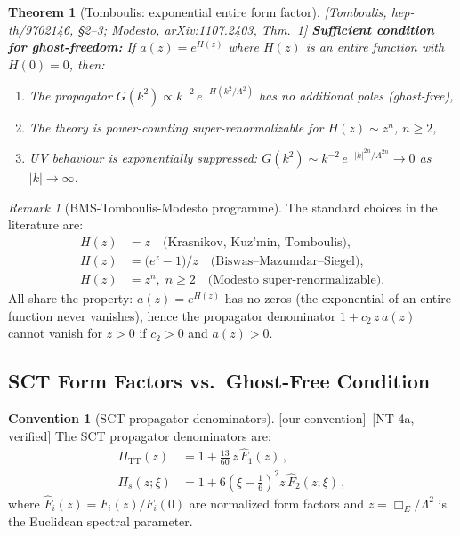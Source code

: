 \documentclass[12pt,a4paper]{article}
\newtheorem{theorem}[proposition]{Theorem}
\theoremstyle{definition}
\newtheorem{convention}[proposition]{Convention}
\theoremstyle{remark}
\newtheorem{remark}[proposition]{Remark}
\newcommand{\fromlit}[1]{\textcolor{blue!70!black}{\textsf{[#1]}}}
\newcommand{\oursign}{\textcolor{teal!80!black}{\textsf{[our convention]}}}
\begin{document}
\begin{theorem}[Tomboulis: exponential entire form factor]
\label{thm:tomboulis}
\fromlit{Tomboulis, hep-th/9702146, \S2--3; Modesto,
arXiv:1107.2403, Thm.~1}
\textbf{Sufficient condition for ghost-freedom:}
If $a(z) = e^{H(z)}$ where $H(z)$ is an entire function with
$H(0) = 0$, then:
\begin{enumerate}[nosep,label=(\roman*)]
  \item The propagator $G(k^2) \propto k^{-2}\,e^{-H(k^2/\Lambda^2)}$
    has no additional poles (ghost-free),
  \item The theory is power-counting super-renormalizable for
    $H(z) \sim z^n$, $n \geq 2$,
  \item UV behaviour is exponentially suppressed:
    $G(k^2) \sim k^{-2}\,e^{-|k|^{2n}/\Lambda^{2n}} \to 0$ as
    $|k| \to \infty$.
\end{enumerate}
\end{theorem}

\begin{remark}[BMS-Tomboulis-Modesto programme]
\label{rem:bms-programme}
The standard choices in the literature are:
\begin{align}
  H(z) &= z \quad \text{(Krasnikov, Kuz'min, Tomboulis)},\\
  H(z) &= \bigl(e^z - 1\bigr)/z
    \quad \text{(Biswas--Mazumdar--Siegel)},\\
  H(z) &= z^n, \; n \geq 2
    \quad \text{(Modesto super-renormalizable)}.
\end{align}
All share the property: $a(z) = e^{H(z)}$ has no zeros (the
exponential of an entire function never vanishes), hence the
propagator denominator $1 + c_2\,z\,a(z)$ cannot vanish for $z > 0$
if $c_2 > 0$ and $a(z) > 0$.
\end{remark}


\subsection{SCT Form Factors vs.\ Ghost-Free Condition}

\begin{convention}[SCT propagator denominators]
\label{conv:sct-denominators}
\oursign\ \fromlit{NT-4a, verified}
The SCT propagator denominators are:
\begin{align}
  \Pi_{\mathrm{TT}}(z) &= 1 + \frac{13}{60}\, z\,\hat{F}_1(z)\,,
    \label{eq:Pi-TT-sct}\\
  \Pi_s(z;\xi) &= 1 + 6\left(\xi - \frac{1}{6}\right)^2
    z\,\hat{F}_2(z;\xi)\,,
    \label{eq:Pi-s-sct}
\end{align}
where $\hat{F}_i(z) = F_i(z)/F_i(0)$ are normalized form factors and
$z = \Box_E/\Lambda^2$ is the Euclidean spectral parameter.
\end{convention}
\end{document}
